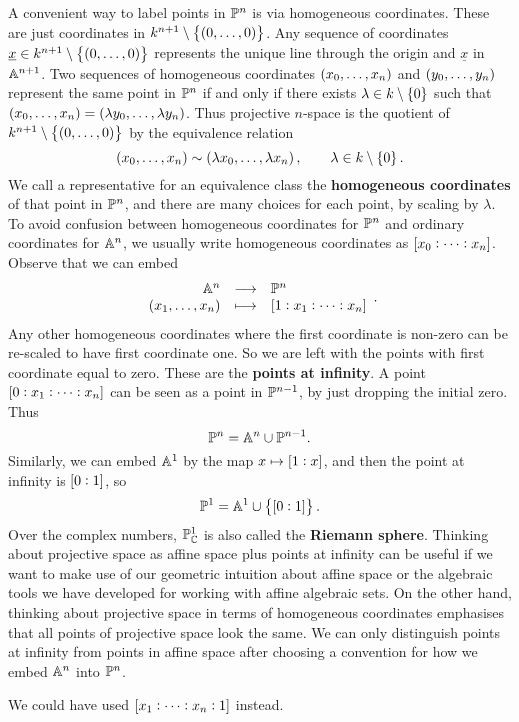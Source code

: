 A convenient way to label points in $ \PP^n $ is via homogeneous coordinates. These are just coordinates in $ k^{n + 1} \setminus \cbr{\br{0, \dots, 0}} $. Any sequence of coordinates $ \underline{x} \in k^{n + 1} \setminus \cbr{\br{0, \dots, 0}} $ represents the unique line through the origin and $ \underline{x} $ in $ \AA^{n + 1} $. Two sequences of homogeneous coordinates $ \br{x_0, \dots, x_n} $ and $ \br{y_0, \dots, y_n} $ represent the same point in $ \PP^n $ if and only if there exists $ \lambda \in k \setminus \cbr{0} $ such that $ \br{x_0, \dots, x_n} = \br{\lambda y_0, \dots, \lambda y_n} $. Thus projective $ n $-space is the quotient of $ k^{n + 1} \setminus \cbr{\br{0, \dots, 0}} $ by the equivalence relation
$$ \br{x_0, \dots, x_n} \sim \br{\lambda x_0, \dots, \lambda x_n}, \qquad \lambda \in k \setminus \cbr{0}. $$
We call a representative for an equivalence class the \textbf{homogeneous coordinates} of that point in $ \PP^n $, and there are many choices for each point, by scaling by $ \lambda $. To avoid confusion between homogeneous coordinates for $ \PP^n $ and ordinary coordinates for $ \AA^n $, we usually write homogeneous coordinates as $ \sbr{x_0 : \dots : x_n} $. Observe that we can embed
$$ \function{\AA^n}{\PP^n}{\br{x_1, \dots, x_n}}{\sbr{1 : x_1 : \dots : x_n}}. $$
Any other homogeneous coordinates where the first coordinate is non-zero can be re-scaled to have first coordinate one. So we are left with the points with first coordinate equal to zero. These are the \textbf{points at infinity}. A point $ \sbr{0 : x_1 : \dots : x_n} $ can be seen as a point in $ \PP^{n - 1} $, by just dropping the initial zero. Thus
$$ \PP^n = \AA^n \cup \PP^{n - 1}. $$
Similarly, we can embed $ \AA^1 $ by the map $ x \mapsto \sbr{1 : x} $, and then the point at infinity is $ \sbr{0 : 1} $, so
$$ \PP^1 = \AA^1 \cup \cbr{\sbr{0 : 1}}. $$
Over the complex numbers, $ \PP_\CC^1 $ is also called the \textbf{Riemann sphere}. Thinking about projective space as affine space plus points at infinity can be useful if we want to make use of our geometric intuition about affine space or the algebraic tools we have developed for working with affine algebraic sets. On the other hand, thinking about projective space in terms of homogeneous coordinates emphasises that all points of projective space look the same. We can only distinguish points at infinity from points in affine space after choosing a convention for how we embed $ \AA^n $ into $ \PP^n $.

\begin{example*}
We could have used $ \sbr{x_1 : \dots : x_n : 1} $ instead.
\end{example*}

